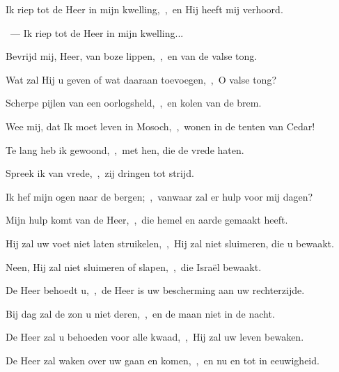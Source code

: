 \documentclass[12pt,twoside,a5paper]{article}
\begin{document}


\begin{halfparskip}

  Ik riep tot de Heer in mijn kwelling,~\sep\ en Hij heeft mij verhoord.

  ~---  Ik riep tot de Heer in mijn kwelling...

  Bevrijd mij, Heer, van boze lippen,~\sep\ en van de valse tong.
\end{halfparskip}

\begin{halfparskip}

  Wat zal Hij u geven of wat daaraan toevoegen,~\sep\ O valse tong?

  Scherpe pijlen van een oorlogsheld,~\sep\ en kolen van de brem.
\end{halfparskip}

\begin{halfparskip}

  Wee mij, dat Ik moet leven in Mosoch,~\sep\ wonen in de tenten van Cedar!

  Te lang heb ik gewoond,~\sep\ met hen, die de vrede haten.

  Spreek ik van vrede,~\sep\ zij dringen tot strijd.
\end{halfparskip}


\begin{halfparskip}

  Ik hef mijn ogen naar de bergen;~\sep\ vanwaar zal er hulp voor mij dagen?

  Mijn hulp komt van de Heer,~\sep\ die hemel en aarde gemaakt heeft.
\end{halfparskip}

\begin{halfparskip}

  Hij zal uw voet niet laten struikelen,~\sep\ Hij zal niet sluimeren, die u bewaakt.

  Neen, Hij zal niet sluimeren of slapen,~\sep\ die Israël bewaakt.

  De Heer behoedt u,~\sep\ de Heer is uw bescherming aan uw rechterzijde.

  Bij dag zal de zon u niet deren,~\sep\ en de maan niet in de nacht.

  De Heer zal u behoeden voor alle kwaad,~\sep\ Hij zal uw leven bewaken.

  De Heer zal waken over uw gaan en komen,~\sep\ en nu en tot in eeuwigheid.
\end{halfparskip}
\end{document}
